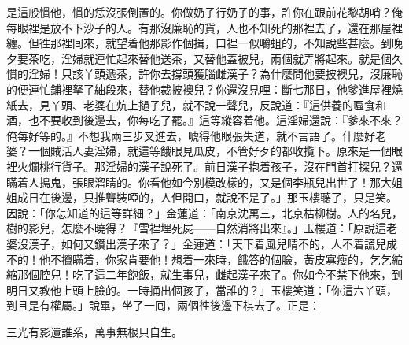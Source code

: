 是這般慣他，慣的恁沒張倒置的。你做奶子行奶子的事，許你在跟前花黎胡哨？俺每眼裡是放不下沙子的人。有那沒廉恥的貨，人也不知死的那裡去了，還在那屋裡纏。但徃那裡囘來，就望着他那影作個揖，口裡一似嚼蛆的，不知說些甚麼。到晚夕要茶吃，淫婦就連忙起來替他送茶，又替他蓋被兒，兩個就弄將起來。就是個久慣的淫婦！只該丫頭遞茶，許你去撐頭獲腦雌漢子？為什麼問他要披襖兒，沒廉恥的便連忙鋪裡拏了紬段來，替他裁披襖兒？你還沒見哩：斷七那日，他爹進屋裡燒紙去，見丫頭、老婆在炕上撾子兒，就不說一聲兒，反說道：『這供養的匾食和酒，也不要收到後邊去，你每吃了罷。』這等縱容着他。這淫婦還說：『爹來不來？俺每好等的。』不想我兩三步叉進去，唬得他眼張失道，就不言語了。什麼好老婆？一個賊活人妻淫婦，就這等餓眼見瓜皮，不管好歹的都收攬下。原來是一個眼裡火爛桃行貨子。那淫婦的漢子說死了。前日漢子抱着孩子，沒在門首打探兒？還瞞着人搗鬼，張眼溜睛的。你看他如今別模改樣的，又是個李瓶兒出世了！{}那大姐姐成日在後邊，只推聾裝啞的，人但開口，就說不是了。」那玉樓聽了，只是笑。因說：「你怎知道的這等詳細？」金蓮道：「南京沈萬三，北京枯柳樹。人的名兒，樹的影兒，怎麼不曉得？『雪裡埋死屍——自然消將出來』。」玉樓道：「原說這老婆沒漢子，如何又鑽出漢子來了？」金蓮道：「天下着風兒晴不的，人不着謊兒成不的！他不攛瞞着，你家肯要他！想着一來時，餓答的個臉，黃皮寡瘦的，乞乞縮縮那個腔兒！{}吃了這二年飽飯，就生事兒，雌起漢子來了。你如今不禁下他來，到明日又教他上頭上臉的。一時捅出個孩子，當誰的？」{}玉樓笑道：「你這六丫頭，到且是有權屬。」說畢，坐了一囘，兩個徃後邊下棋去了。正是：

\begin{myquote}
三光有影遺誰系，萬事無根只自生。
\end{myquote}

